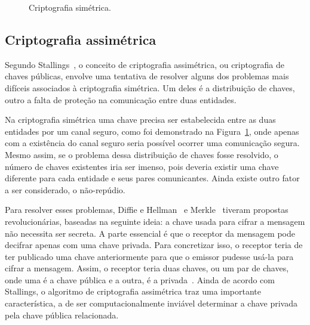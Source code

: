 \documentclass{article}
\begin{document}
\begin{figure}[!ht]
  \centering
  \caption{Criptografia simétrica.}\label{fig:2}
\end{figure}

\subsection{Criptografia assimétrica}\label{subsec:asymmetric}

Segundo Stallings~\cite{Stallings:book:2016}, o conceito de criptografia
assimétrica, ou criptografia de chaves públicas, envolve uma tentativa de
resolver alguns dos problemas mais difíceis associados à criptografia
simétrica. Um deles é a distribuição de chaves, outro a falta de proteção na
comunicação entre duas entidades.

Na criptografia simétrica uma chave precisa ser estabelecida entre as duas
entidades por um canal seguro, como foi demonstrado na Figura~\ref{fig:2}, onde
apenas com a existência do canal seguro seria possível ocorrer uma comunicação
segura. Mesmo assim, se o problema dessa distribuição de chaves fosse
resolvido, o número de chaves existentes iria ser imenso, pois deveria existir
uma chave diferente para cada entidade e seus pares comunicantes. Ainda existe
outro fator a ser considerado, o não-repúdio.

Para resolver esses problemas, Diffie e Hellman~\cite{Diffie:article:1976:sep}
e Merkle~\cite{Merkle:phd:1979:jun} tiveram propostas revolucionárias, baseadas
na seguinte ideia: a chave usada para cifrar a mensagem não necessita ser
secreta. A parte essencial é que o receptor da mensagem pode decifrar apenas
com uma chave privada. Para concretizar isso, o receptor teria de ter publicado
uma chave anteriormente para que o emissor pudesse usá-la para cifrar
a mensagem. Assim, o receptor teria duas chaves, ou um par de chaves, onde uma
é a chave pública e a outra, é a privada~\cite{Paar:book:2009}. Ainda de acordo
com Stallings, o algoritmo de criptografia assimétrica traz uma importante
característica, a de ser computacionalmente inviável determinar a chave privada
pela chave pública relacionada.
\end{document}
